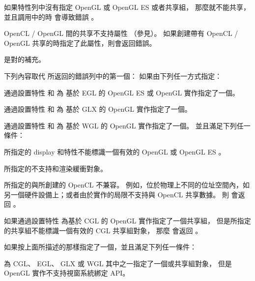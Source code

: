 如果特性列中沒有指定 OpenGL 或 OpenGL ES 或者共享組，
那麼就不能共享，
並且調用中的時
會導致錯誤 。

OpenCL / OpenGL 間的共享不支持屬性 
 （參見）。
如果創建帶有 OpenCL / OpenGL 共享的時指定了此屬性，則會返回錯誤。

是對的補充。

{}

下列內容取代  所返回的錯誤列中的第一個：
\startreplacepar
如果由下列任一方式指定：
\startigBase[indentnext=no]
\item 通過設置特性  和  為
基於 EGL 的 OpenGL ES 或 OpenGL 實作指定了一個。

\item 通過設置特性  和  為
基於 GLX 的 OpenGL 實作指定了一個。

\item 通過設置特性  和  為
基於 WGL 的 OpenGL 實作指定了一個。
\stopigBase
並且滿足下列任一條件：
\startigBase[indentnext=no]
\item 所指定的 display 和特性不能標識一個有效的 OpenGL 或 OpenGL ES 。

\item 所指定的不支持和渲染緩衝對象。

\item 所指定的與所創建的 OpenCL 不兼容。
例如，位於物理上不同的位址空間內，如另一個硬件設備上；或者由於實作的局限不支持與 OpenCL 共享數據。
\stopigBase
則  會返回 。

如果通過設置特性  為基於 CGL 的 OpenGL 實作指定了一個共享組，
但是所指定的共享組不能標識一個有效的 CGL 共享組對象，
那麼  會返回 。

如果按上面所描述的那樣指定了一個，並且滿足下列任一條件：
\startigBase[indentnext=no]
\item 為 CGL、 EGL、 GLX 或 WGL 其中之一指定了一個或共享組對象，
但是 OpenGL 實作不支持視窗系統綁定 API。

